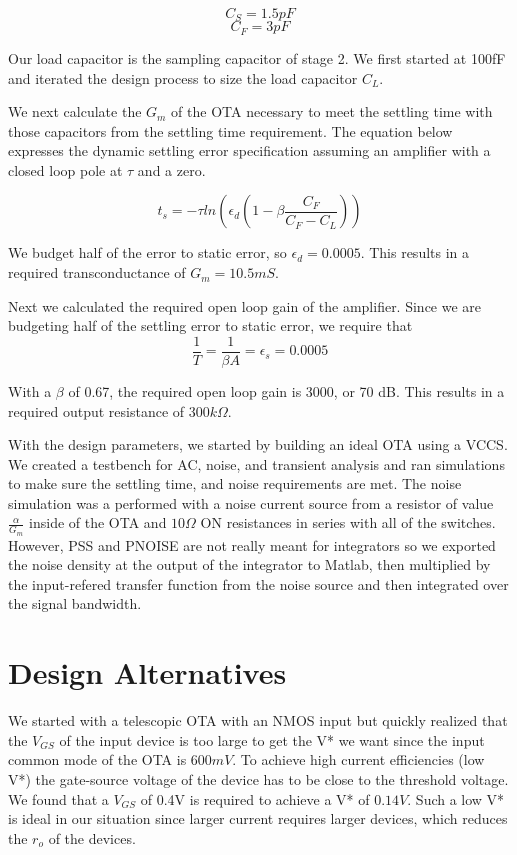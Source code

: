 \documentclass[conference]{IEEEtran}
\begin{document}
$$C_S = 1.5pF$$ 
$$C_F = 3pF$$

Our load capacitor is the sampling capacitor of stage 2. We first started at 100fF and iterated the design process to size the load capacitor $C_L$.

We next calculate the $G_m$ of the OTA necessary to meet the settling time with those capacitors from the settling time requirement. The equation below expresses the dynamic settling error specification assuming an amplifier with a closed loop pole at $\tau$ and a zero.

$$t_s = -\tau ln \left(\epsilon_d \left(1-\beta \frac{C_F}{C_F-C_L}\right)\right)$$

We budget half of the error to static error, so $\epsilon_d = 0.0005$. This results in a required transconductance of $G_m = 10.5mS$.

Next we calculated the required open loop gain of the amplifier. Since we are budgeting half of the settling error to static error, we require that
$$\frac{1}{T} = \frac{1}{\beta A} = \epsilon_s = 0.0005$$

With a $\beta$ of 0.67, the required open loop gain is 3000, or 70 dB. This results in a required output resistance of $300k\Omega$.

With the design parameters, we started by building an ideal OTA using a VCCS. We created a testbench for AC, noise, and transient analysis and ran simulations to make sure the settling time, and noise requirements are met. The noise simulation was a performed with a noise current source from a resistor of value $\frac{\alpha}{G_m}$ inside of the OTA and $10\Omega$ ON resistances in series with all of the switches. However, PSS and PNOISE are not really meant for integrators so we exported the noise density at the output of the integrator to Matlab, then multiplied by the input-refered transfer function from the noise source and then integrated over the signal bandwidth.

\section{Design Alternatives}

We started with a telescopic OTA with an NMOS input but quickly realized that the $V_{GS}$ of the input device is too large to get the V* we want since the input common mode of the OTA is $600mV$. To achieve high current efficiencies (low V*) the gate-source voltage of the device has to be close to the threshold voltage. We found that a $V_{GS}$ of 0.4V is required to achieve a V* of $0.14V$. Such a low V* is ideal in our situation since larger current requires larger devices, which reduces the $r_o$ of the devices.
\end{document}
